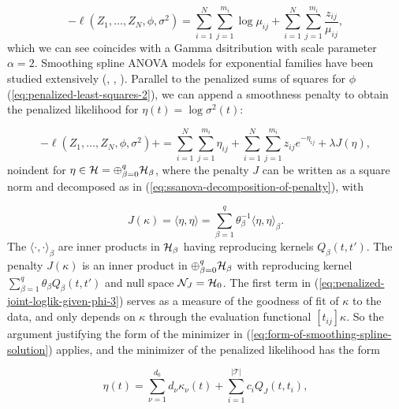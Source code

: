 \begin{equation} \label{eq:penalized-joint-loglik-given-phi-3}
-\ell\left( Z_1,\dots, Z_N, \phi, \sigma^2 \right) =  \sum_{i = 1}^N \sum_{j = 1}^{m_i} \log \mu_{ij}  + \sum_{i = 1}^N \sum_{j = 1}^{m_i} \frac {z_{ij}}{\mu_{ij}},
\end{equation}
\noindent
which we can see coincides with a Gamma dsitribution with scale parameter $\alpha = 2$. Smoothing spline ANOVA models for exponential families have been studied extensively (\cite{wahba1995smoothing}, \cite{wang1997grkpack}, \cite{gu2013smoothing}). Parallel to the penalized sums of squares for $\phi$ (\ref{eq:penalized-least-squares-2}), we can append a smoothness penalty to obtain the penalized likelihood for $\eta\left(t\right) = \log\sigma^2\left(t\right)$:

\begin{equation} \label{eq:penalized-joint-loglik-given-phi-3}
-\ell\left( Z_1,\dots, Z_N, \phi, \sigma^2 \right) + =  \sum_{i = 1}^N \sum_{j = 1}^{m_i} \eta_{ij}  + \sum_{i = 1}^N \sum_{j = 1}^{m_i} z_{ij} e^{-\eta_{ij}} + \lambda J\left(\eta\right),  
\end{equation}
noindent
for $\eta \in \mathcal{H} = \oplus_{\beta = 0}^q \mathcal{H}_\beta$, where the penalty $J$ can be written as a square norm and decomposed as in (\ref{eq:ssanova-decomposition-of-penalty}), with

\begin{equation*} 
J\left(\kappa \right) = \langle \eta,\eta \rangle = \sum_{\beta = 1}^q \theta_\beta^{-1}\langle \eta,\eta \rangle_{\beta}.
\end{equation*}
\noindent 
The $\langle \cdot, \cdot \rangle_{\beta}$ are inner products in $\mathcal{H}_\beta$ having reproducing kernels $Q_\beta\left(t,t'\right)$. The penalty $J\left(\kappa\right)$ is an inner product in $\oplus_{\beta = 0}^q \mathcal{H}_\beta$ with reproducing kernel $\sum_{\beta=1}^q \theta_\beta Q_\beta\left(t, t'\right)$ and null space $\mathcal{N}_J = \mathcal{H}_0$. The first term in (\ref{eq:penalized-joint-loglik-given-phi-3}) serves as a measure of the goodness of fit of $\kappa$ to the data, and only depends on $\kappa$ through the evaluation functional $\left[t_{ij}\right]\kappa$. So the argument justifying the form of the minimizer in (\ref{eq:form-of-smoothing-spline-solution}) applies, and the minimizer of the penalized likelihood has the form 

\begin{equation} \label{eq:form-of-smoothing-spline-solution-kappa}
\eta\left( t \right) = \sum_{\nu = 1}^{d_0} d_\nu\kappa_\nu\left( t \right) + \sum_{i = 1}^{\vert \mathcal{T} \vert} c_i Q_J\left( t, t_i \right),
\end{equation}  

